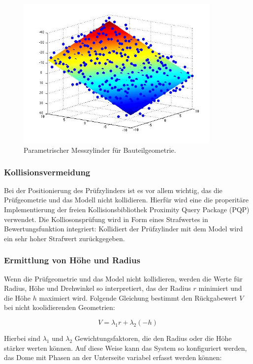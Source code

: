\begin{figure}[ht]
\centering
\includegraphics[width=10cm]{graphics/planefit.jpg}
\caption{Parametrischer Messzylinder f\"ur Bauteilgeometrie.}
\label{im:messlehre}
\end{figure}

\subsubsection{Kollisionsvermeidung}

Bei der Positionierung des Pr\"ufzylinders ist es vor allem wichtig, das die Pr\"ufgeometrie und das Modell nicht kollidieren. Hierf\"ur wird eine die properit\"are Implementierung der freien Kollisionsbibliothek Proximity Query Package (PQP) verwendet. Die Kolliosonspr\"ufung wird in Form eines Strafwertes in Bewertungsfunktion integriert: Kollidiert der Pr\"ufzylinder mit dem Model wird ein sehr hoher Strafwert zur\"uckgegeben.

\subsubsection{Ermittlung von H\"ohe und Radius}

Wenn die Pr\"ufgeometrie und das Model nicht kollidieren, werden die Werte f\"ur Radius, H\"ohe und Drehwinkel so interpretiert, das der Radius ${r}$ minimiert und die H\"ohe ${h}$ maximiert wird. Folgende Gleichung bestimmt den R\"uckgabewert ${V}$ bei nicht koolidierenden Geometrien:

\begin{equation}
{V=\lambda_{1}{r} + \lambda_{2}({-h})}
\end{equation}

Hierbei sind $\lambda_{1}$ und $\lambda_{2}$ Gewichtungsfaktoren, die  den Radius oder die H\"ohe st\"arker werten k\"onnen. Auf diese Weise kann das System so konfiguriert werden, das Dome mit Phasen an der Unterseite variabel erfasst werden k\"onnen: 

